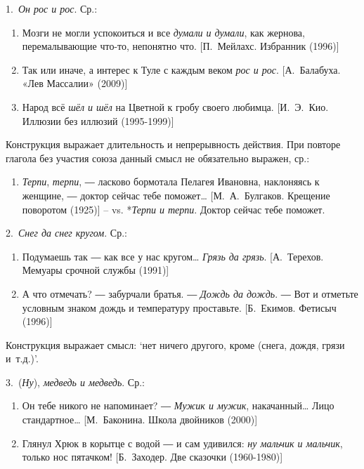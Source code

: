 1.~\emph{Он рос и рос}. Ср.:

\begin{enumerate}
\def\labelenumi{(\arabic{enumi})}
\setcounter{enumi}{160}
\item
  Мозги не могли успокоиться и все \emph{думали и думали}, как жернова,
  перемалывающие что-то, непонятно что. {[}П.~Мейлахс. Избранник
  (1996){]}
\item
  Так или иначе, а интерес к Туле с каждым веком \emph{рос и рос}.
  {[}А.~Балабуха. «Лев Массалии» (2009){]}
\item
  Народ всё \emph{шёл и шёл} на Цветной к гробу своего любимца.
  {[}И.~Э.~Кио. Иллюзии без иллюзий (1995-1999){]}
\end{enumerate}

Конструкция выражает длительность и непрерывность действия. При повторе
глагола без участия союза данный смысл не обязательно выражен, ср.:

\begin{enumerate}
\def\labelenumi{(\arabic{enumi})}
\setcounter{enumi}{163}
\item
  \emph{Терпи}, \emph{терпи}, ― ласково бормотала Пелагея Ивановна,
  наклоняясь к женщине, ― доктор сейчас тебе поможет\ldots{}
  {[}М.~А.~Булгаков. Крещение поворотом (1925){]} -- vs. *\emph{Терпи и
  терпи}. Доктор сейчас тебе поможет.
\end{enumerate}

2.~\emph{Снег да снег кругом}. Ср.:

\begin{enumerate}
\def\labelenumi{(\arabic{enumi})}
\setcounter{enumi}{164}
\item
  Подумаешь так ― как все у нас кругом\ldots{} \emph{Грязь да грязь}.
  {[}А.~Терехов. Мемуары срочной службы (1991){]}
\item
  А что отмечать? ― забурчали братья. ― \emph{Дождь да дождь}. ― Вот и
  отметьте условным знаком дождь и температуру проставьте. {[}Б.~Екимов.
  Фетисыч (1996){]}
\end{enumerate}

Конструкция выражает смысл: `нет ничего другого, кроме (снега, дождя,
грязи и~т.д.)'.

3.~(\emph{Ну}), \emph{медведь и медведь}. Ср.:

\begin{enumerate}
\def\labelenumi{(\arabic{enumi})}
\setcounter{enumi}{166}
\item
  Он тебе никого не напоминает? ― \emph{Мужик и мужик},
  накачанный\ldots{} Лицо стандартное\ldots{} {[}М.~Баконина. Школа
  двойников (2000){]}
\item
  Глянул Хрюк в корытце с водой ― и сам удивился: \emph{ну мальчик и
  мальчик}, только нос пятачком! {[}Б.~Заходер. Две сказочки
  (1960-1980){]}
\end{enumerate}

